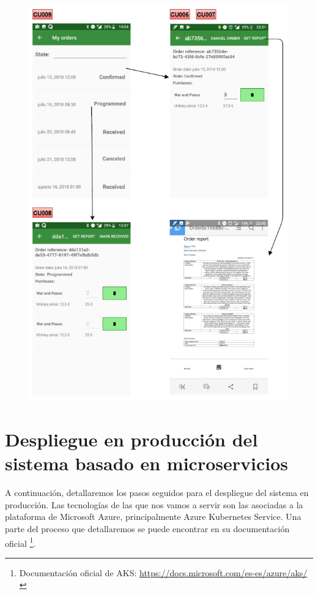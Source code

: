 \documentclass[11pt,spanish,listoffigures]{tfgetsinf}
\begin{document}
\begin{figure}[h]
\centering
\includegraphics[scale=1.2]{ModeloUI_Final4}
\end{figure}

%

\chapter{Despliegue en producción del sistema basado en microservicios} \label{chap:Despliegue}

A continuación, detallaremos los pasos seguidos para el despliegue del sistema en producción. Las tecnologías de las que nos vamos a servir son las asociadas a la plataforma de Microsoft Azure, principalmente Azure Kubernetes Service. Una parte del proceso que detallaremos se puede encontrar en su documentación oficial \footnote{ Documentación oficial de AKS: \url{https://docs.microsoft.com/es-es/azure/aks/}}.
\end{document}
